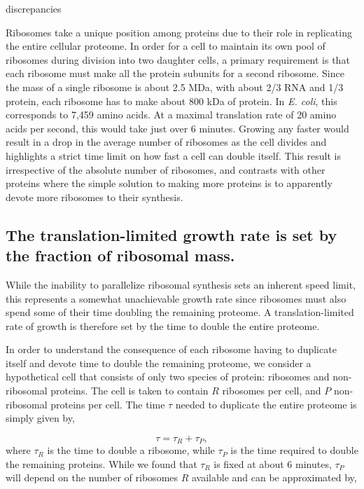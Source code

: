 discrepancies \documentclass[11pt, letterpaper]{article}
\begin{document}
Ribosomes take a unique position among proteins due to their role in replicating
the entire cellular proteome. In order for a cell to maintain its own pool of
ribosomes during division into two daughter cells, a primary requirement is that
each ribosome must make all the protein subunits for a second ribosome.  Since
the  mass of a single ribosome is about 2.5 MDa, with about 2/3 RNA and 1/3
protein, each ribosome has to make about 800 kDa of protein. In {\it E. coli},
this corresponds to 7,459 amino acids. At a maximal translation rate of 20 amino
acids per second, this would take just over 6 minutes.  Growing any faster would
result in a drop in the average number of ribosomes as the cell divides and
highlights a strict time limit on how fast a cell can double itself.  This result is
irrespective of the absolute number of ribosomes, and contrasts with other
proteins where the simple solution to making more proteins is to apparently
devote more ribosomes to their synthesis.

\subsection{The translation-limited growth rate is set by the fraction of
ribosomal mass.}

While the inability to parallelize ribosomal synthesis sets an inherent speed
limit, this represents a somewhat unachievable growth rate since ribosomes must
also spend some of their time doubling the remaining proteome.
A translation-limited rate of growth is therefore set by the time to
double the entire proteome.


In order to understand the consequence of each ribosome having to duplicate
itself and devote time to double the remaining proteome, we consider a
hypothetical cell that consists of only two species of protein: ribosomes and
non-ribosomal proteins. The cell is taken to contain $R$ ribosomes per cell, and $P$
non-ribosomal proteins per cell. The time $\tau$ needed to duplicate the entire
proteome is simply given by,

\begin{equation}
	\tau = \tau_R + \tau_P,
\label{eq:tau}
\end{equation}
where $\tau_R$ is the time to double a ribosome, while $\tau_P$ is the time
required to double the remaining proteins. While we found that $\tau_R$ is fixed
at about 6 minutes,  $\tau_P$  will depend on the number of ribosomes $R$ available and
can be approximated by,
\end{document}
